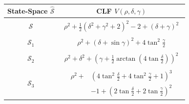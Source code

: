 \documentclass[journal,twoside,web]{ieeecolor}
\theoremstyle{definition}
\begin{document}
\begin{table}[t]
\small
\renewcommand\arraystretch{2.2}
\begin{tabular}{ |c|c| } 
\hline
\textbf{State-Space} $\hat{\mathcal{S}}$ & \textbf{CLF} $V(\rho,\delta,\gamma)$ \\
\hline
\hline
$\mathcal{S}$ 
& $\begin{aligned}
  \rho^2 +   \tfrac{1}{2}(\delta^2 + \gamma^2 + 2)^2 - 2 + (\delta + \gamma)^2
\end{aligned}$ \\
\hline
$\mathcal{S}_1$ 
& $\begin{aligned}
    \rho^2 + (\delta + \sin \gamma)^2 + 4\tan^2 \frac{\gamma}{2}
\end{aligned}$ \\
\hline
$\mathcal{S}_2$  
& $\begin{aligned}
   \rho^2 +  \delta^2 + \left(\gamma + \tfrac{1}{2}\arctan\!\left(4\tan \tfrac{\delta}{2}\right)\right)^2
\end{aligned}$ \\
\hline

$\mathcal{S}_3$  
& $\begin{aligned}
  \rho^2 +  &\left(4\tan^2 \tfrac{\delta}{2} + 4\tan^2 \tfrac{\gamma}{2} + 1\right)^3 \\
    &- 1 + \left(2\tan \tfrac{\delta}{2} + 2\tan \tfrac{\gamma}{2}\right)^2
\end{aligned}$ \\
\hline
\end{tabular}






\end{table}
\end{document}
